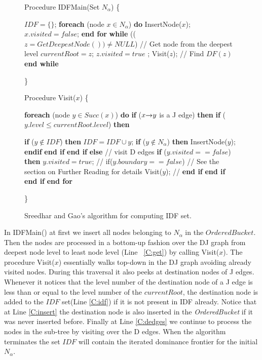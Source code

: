 {\begin{figure}[!ht]
\begin{minipage}[t]{5in}
Procedure IDFMain(Set $N_{\alpha}$) 
\{
\begin{code}
 $IDF = \{ \}$;
 {\bf foreach} (node $x \in  N_{\alpha}$) {\bf do}
    InsertNode($x$);
    $x.visited = false $;
 {\bf end for}
 {\bf while} (($z = GetDeepestNode()) \neq NULL$)  \label{C:get} // Get node from the deepest level
   $currentRoot = z$;
   $z.visited = true$ ;
   Visit($z$);  // Find $DF(z)$
 {\bf end while}
\end{code}
\} 

Procedure Visit($x$)
\{
\begin{code}
 {\bf foreach} (node $y \in  Succ(x)$) {\bf do}
  {\bf if} ($x \st{} y$ is a  J edge) {\bf then}
   {\bf if} ($y.level \leq currentRoot.level$) {\bf then}

     {\bf if} ($y \not \in IDF$) {\bf then}
        $IDF = IDF \cup {y}$;   \label{C:idf}
        {\bf if} ($y \not  \in N_{\alpha}$) {\bf then}
          InsertNode($y$); \label{C:insert}
        {\bf endif}
     {\bf end if}
  {\bf end if}
 {\bf else} // visit D edges 
   {\bf if} ($y.visited == false $) {\bf then}
    $y.visited = true$;
    // if($y.boundary == false$)   \label{C:cached} // See the section on Further Reading for details
     Visit($y$); \label{C:dedges}
 // {\bf end if}
   {\bf end if}
  {\bf end if}
 {\bf end for}
\end{code}
\} 
\end{minipage}
\caption{Sreedhar and Gao's algorithm for computing IDF set.}
\label{F:IDFMain}
\end{figure}

In IDFMain() at first we insert all nodes belonging to $N_{\alpha}$ in the $OrderedBucket$. Then the nodes are processed
in a bottom-up fashion over the DJ graph from deepest node level to least node level
(Line ~\ref{C:get}) by calling Visit($x$). The procedure Visit($x$) essentially walks top-down in the  DJ graph avoiding already visited nodes. During this traversal it also peeks at destination nodes of J edges. Whenever it notices that the level number of the destination node of a J edge is less than or equal to the level number of the $currentRoot$, the destination node is added to the $IDF$ set(Line \ref{C:idf}) if it is not present in IDF already. Notice that at Line \ref{C:insert} the destination node is also inserted in the {\it OrderedBucket} if it was never inserted before. Finally at Line \ref{C:dedges} we continue to process the nodes in the sub-tree by visiting over the D edges. When the algorithm terminates the 
set $IDF$ will contain the iterated dominance frontier for the initial $N_{\alpha}$.

}
